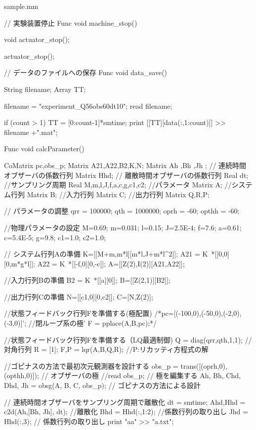 \begin{itembox}[l]{sample.mm}
\begin{verbatimtab}[4]
// 実験装置停止
Func void machine_stop()
{
	void actuator_stop();

	actuator_stop();
}

// データのファイルへの保存
Func void data_save()
{
	String filename;
	Array TT;

	filename = "experiment_Q56obs60dt10";
	read filename;

	if (count > 1) {
		TT = [0:count-1]*smtime;
		print [[TT][data(:,1:count)]] >> filename +".mat";
	}
}

Func void calcParameter(){

    CoMatrix pc,obs_p;
    Matrix A21,A22,B2,K,N;
	Matrix Ah ,Bh ,Jh ; // 連続時間オブザーバの係数行列
	Matrix Hhd; // 離散時間オブザーバの係数行列
	Real dt; //サンプリング周期
	Real M,m,l,J,f,a,c,g,c1,c2; //パラメータ
	Matrix A; //システム行列
	Matrix B; //入力行列
	Matrix C; //出力行列
	Matrix Q,R,P;

    
	// パラメータの調整
	qrr = 100000;
	qth = 1000000;
	oprh = -60;
	opthh = -60;

    //物理パラメータの設定
	M=0.69;   m=0.031; l=0.15;
	J=2.5E-4; f=7.6; a=0.61;
	c=5.4E-5; g=9.8; c1=1.0;
	c2=1.0;

    // システム行列Aの準備
    K=[[M+m,m*l][m*l,J+m*l^2]];
	A21 = K~*[[0,0][0,m*g*l]];
	A22 = K~*[[-f,0][0,-c]];
	A=[[Z(2),I(2)][A21,A22]];

    //入力行列Bの準備
	B2 = K~*[[a][0]];
	B=[[Z(2,1)][B2]];

	//出力行列Cの準備
    N=[[c1,0][0,c2]];
    C=[N,Z(2)];

	//状態フィードバック行列Fを準備する(極配置)
    /*pc=[(-100,0),(-50,0),(-2,0),(-3,0)]'; //閉ループ系の極'
    F = pplace(A,B,pc);*/

    //状態フィードバック行列Fを準備する（LQ最適制御)
    Q = diag(qrr,qth,1,1); // 対角行列
    R = [1];
    {F,P} = lqr(A,B,Q,R); //P:リカッティ方程式の解

	//ゴピナスの方法で最初次元観測器を設計する
	obs_p = trans([(oprh,0), (opthh,0)]); // オブザーバの極
	//read obs_p; // 極を編集する
	{Ah, Bh, Chd, Dhd, Jh} = obsg(A, B, C, obs_p); // ゴピナスの方法による設計

	// 連続時間オブザーバをサンプリング周期で離散化
	dt = smtime;
	{Ahd,Hhd} = c2d(Ah,[Bh, Jh], dt); //離散化
	Bhd = Hhd(:,1:2); //係数行列の取り出し
	Jhd = Hhd(:,3); // 係数行列の取り出し
print "aa" >> "a.txt";

}

		\end{verbatimtab}
	\end{itembox}
